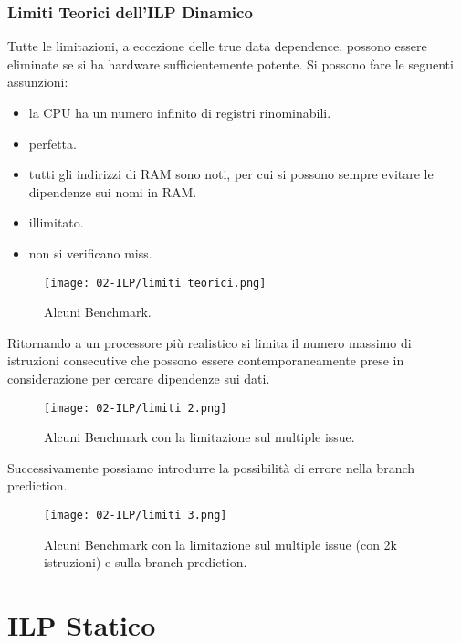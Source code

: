 \subsubsection{Limiti Teorici dell'ILP Dinamico}

Tutte le limitazioni, a eccezione delle true data dependence, possono essere eliminate se si ha hardware sufficientemente potente. Si possono fare le seguenti assunzioni: 

\begin{itemize}
  \item {} la CPU ha un numero infinito di registri rinominabili. 
  \item {} perfetta. 
  \item {} tutti gli indirizzi di RAM sono noti, per cui si possono sempre evitare le dipendenze sui nomi in RAM.
\item {} illimitato. 
\item {} non si verificano miss.
\end{itemize}

\begin{figure}[!h]
    \centering
    \texttt{[image: 02-ILP/limiti teorici.png]}
    \caption{Alcuni Benchmark.}
\end{figure}

Ritornando a un processore più realistico si limita il numero massimo di istruzioni consecutive che possono essere contemporaneamente prese in considerazione per cercare dipendenze sui dati.

\begin{figure}[!h]
    \centering
    \texttt{[image: 02-ILP/limiti 2.png]}
    \caption{Alcuni Benchmark con la limitazione sul multiple issue.}
\end{figure}

Successivamente possiamo introdurre la possibilità di errore nella branch prediction. 

\begin{figure}[!h]
    \centering
    \texttt{[image: 02-ILP/limiti 3.png]}
    \caption{Alcuni Benchmark con la limitazione sul multiple issue (con 2k istruzioni) e sulla branch prediction.}
\end{figure}




\section{ILP Statico} 

















